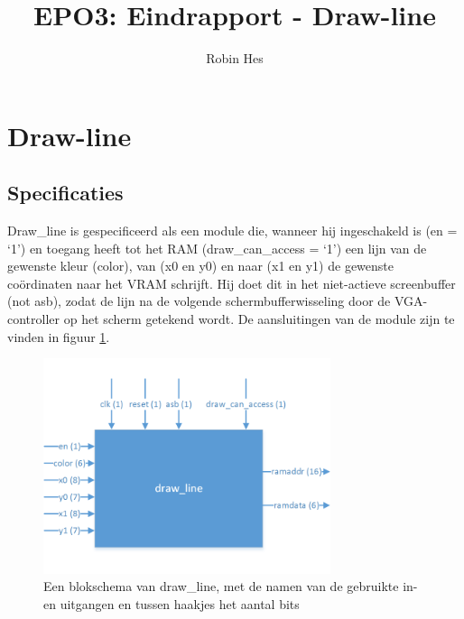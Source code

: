 \documentclass{scrartcl} %
\author{Robin Hes}
\title{EPO3: Eindrapport - Draw-line}
\begin{document}
\section{Draw-line}
\label{sec:draw-line}

\subsection{Specificaties}
Draw\_line is gespecificeerd als een module die, wanneer hij ingeschakeld is (en = `1') en toegang heeft tot het RAM (draw\_can\_access = `1') een lijn van de gewenste kleur (color), van (x0 en y0) en naar (x1 en y1) de gewenste coördinaten naar het VRAM schrijft. Hij doet dit in het niet-actieve screenbuffer (not asb), zodat de lijn na de volgende schermbufferwisseling door de VGA-controller op het scherm getekend wordt. De aansluitingen van de module zijn te vinden in figuur \ref{fig:draw-line-schema}.

\begin{figure}[H]
	\centering
	\includegraphics[width=0.75\textwidth]{resource/draw_line.png}
	\caption{Een blokschema van draw\_line, met de namen van de gebruikte in- en uitgangen en tussen haakjes het aantal bits}
	\label{fig:draw-line-schema}
\end{figure}

\end{document}
